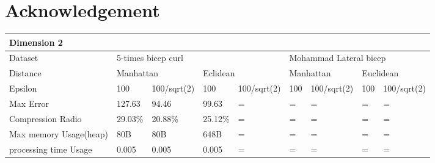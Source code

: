 \documentclass[10pt, conference, compsocconf]{IEEEtran}
\begin{document}
\section*{Acknowledgement}
\begin{table}[]
    \begin{tabular}{|l|l|l|l|l|l|l|l|l|}
    \hline
    \multicolumn{9}{|l|}{Dimension 2}                                                                                                                         \\ \hline
    Dataset                & \multicolumn{4}{l|}{5-times bicep curl}                        & \multicolumn{4}{l|}{Mohammad Lateral bicep}                     \\ \hline
    Distance               & \multicolumn{2}{l|}{Manhattan} & \multicolumn{2}{l|}{Eclidean} & \multicolumn{2}{l|}{Manhattan} & \multicolumn{2}{l|}{Euclidean} \\ \hline
    Epsilon                & 100          & 100/sqrt(2)     & 100         & 100/sqrt(2)     & 100        & 100/sqrt(2)       & 100        & 100/sqrt(2)       \\ \hline
    Max Error              & 127.63       & 94.46           & 99.63       & =               & =          & =                 & =          & =                 \\ \hline
    Compression Radio      & 29.03\%      & 20.88\%         & 25.12\%     & =               & =          & =                 & =          & =                 \\ \hline
    Max memory Usage(heap) & 80B          & 80B             & 648B        & =               & =          & =                 & =          & =                 \\ \hline
    processing time Usage  & 0.005        & 0.005           & 0.005       & =               & =          & =                 & =          & =                 \\ \hline
    \end{tabular}
\end{table}
\end{document}
